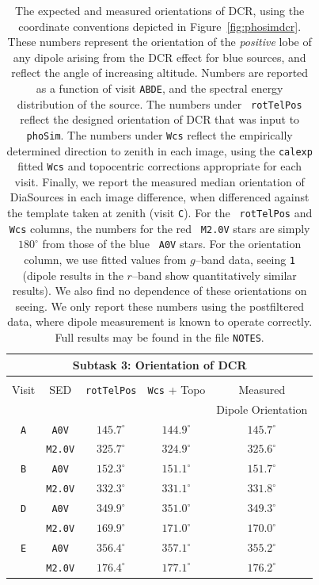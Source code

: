 \documentclass[DM,toc]{lsstdoc}
\def\A{{\tt A}}
\def\B{{\tt B}}
\def\C{{\tt C}}
\def\D{{\tt D}}
\def\E{{\tt E}}
\begin{document}
\begin{table}
\centering
\begin{tabular}{ccccc}
\hline
\multicolumn{5}{|c|}{Subtask 3: Orientation of DCR} \\ \hline \\
Visit    & SED & {\tt rotTelPos} & {\tt Wcs} + Topo & Measured \\
         &     &                 &                  & Dipole Orientation \\
\hline
\A & {\tt A0V}   & $145.7^{\circ}$ & $144.9^{\circ}$ & $145.7^{\circ}$    \\
   & {\tt M2.0V} & $325.7^{\circ}$ & $324.9^{\circ}$ & $325.6^{\circ}$    \\
\hline
\B & {\tt A0V}   & $152.3^{\circ}$ & $151.1^{\circ}$ & $151.7^{\circ}$    \\
   & {\tt M2.0V} & $332.3^{\circ}$ & $331.1^{\circ}$ & $331.8^{\circ}$    \\
\hline
\D & {\tt A0V}   & $349.9^{\circ}$ & $351.0^{\circ}$ & $349.3^{\circ}$    \\
   & {\tt M2.0V} & $169.9^{\circ}$ & $171.0^{\circ}$ & $170.0^{\circ}$    \\
\hline
\E & {\tt A0V}   & $356.4^{\circ}$ & $357.1^{\circ}$ & $355.2^{\circ}$    \\
   & {\tt M2.0V} & $176.4^{\circ}$ & $177.1^{\circ}$ & $176.2^{\circ}$    \\
\end{tabular}
\caption[So I can have 2 paragraphs]{The expected and measured
  orientations of DCR, using the coordinate conventions depicted in
  Figure~\ref{fig:phosimdcr}.  These numbers represent the orientation
  of the {\it positive} lobe of any dipole arising from the DCR effect
  for blue sources, and reflect the angle of increasing altitude.
  Numbers are reported as a function of visit \A\B\D\E, and the
  spectral energy distribution of the source.  The numbers under {\tt
    rotTelPos} reflect the designed orientation of DCR that was input
  to {\tt phoSim}.  The numbers under {\tt Wcs} reflect the
  empirically determined direction to zenith in each image, using the
  {\tt calexp} fitted {\tt Wcs} and topocentric corrections
  appropriate for each visit.  Finally, we report the measured median
  orientation of DiaSources in each image difference, when differenced
  against the template taken at zenith (visit \C).  For the {\tt
    rotTelPos} and {\tt Wcs} columns, the numbers for the red {\tt
    M2.0V} stars are simply $180^{\circ}$ from those of the blue {\tt
    A0V} stars.  For the orientation column, we use fitted values from
  $g$--band data, seeing {\tt 1} (dipole results in the $r$--band show
  quantitatively similar results).  We also find no dependence of
  these orientations on seeing.  We only report these numbers using
  the postfiltered data, where dipole measurement is known to operate
  correctly.  Full results may be found in the file {\tt NOTES}.}
\label{tab:dcrang}
\end{table}
\end{document}
